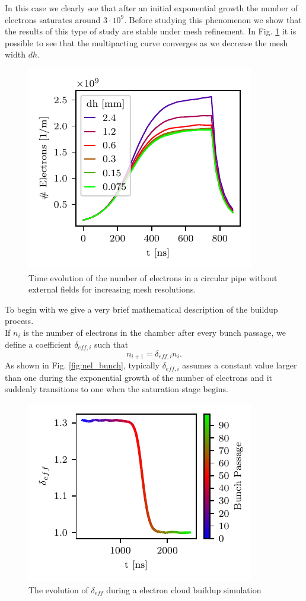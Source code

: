 In this case we clearly see that after an initial exponential growth the number of electrons saturates around $3\cdot10^9$.
Before studying this phenomenon we show that the results of this type of study are stable under mesh refinement. In Fig. \ref{fig:scan_dh} it is possible to see that the multipacting curve converges as we decrease the mesh width $dh$.
\begin{figure}
    \centering
    \includegraphics[scale=1.4]{chapters/Chapter1/Figures/scan_dh.pdf}
    \caption{Time evolution of the number of electrons in a circular pipe without external fields for increasing mesh resolutions.}
    \label{fig:scan_dh}
\end{figure}
To begin with we give a very brief mathematical description of the buildup process.\\
If $n_i$ is the number of electrons in the chamber after every bunch passage, we define a coefficient $\delta_{eff, i}$  such that $$n_{i+1} = \delta_{eff, i} n_i.$$
As shown in Fig. \ref{fig:nel_bunch}, typically $\delta_{eff, i}$ assumes a constant value larger than one during the exponential growth of the number of electrons and it suddenly transitions to one when the saturation stage begins.
\begin{figure}
    \centering
    \includegraphics[scale=1.4]{chapters/Chapter1/Figures/delta_eff.pdf}
    \caption{The evolution of $\delta_{eff}$ during a electron cloud buildup simulation}
    \label{fig:delta_eff}
\end{figure}

